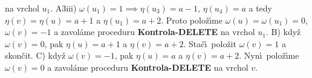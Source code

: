 na vrchol $u_1$.\newline 
A3iii) $\omega \left(u_1\right)=1\implies\eta \left(u_3\right)=a-1,\,\eta \left(u_4\right)=a$ a tedy 
$\eta \left(v\right)=\eta \left(u\right)=a+1$ a $\eta \left(u_1\right)=a+2$. Proto polo\v z\'\i me 
$\omega \left(u\right)=\omega \left(u_1\right)=0$, $\omega \left(v\right)=-1$ a zavol\'ame proceduru {\bf Kontrola-DELETE }
na vrchol $u_1$.\newline 
B) kdy\v z $\omega \left(v\right)=0$, pak $\eta \left(u\right)=a+1$ a $\eta \left(v\right)=a+2$. 
Sta\v c\'\i\ polo\v zit $\omega \left(v\right)=1$ a skon\v cit.\newline 
C) kdy\v z $\omega \left(v\right)=-1$, pak $\eta \left(u\right)=a$ a $\eta \left(v\right)=a+2$. 
Nyn\'\i\ polo\v z\'\i me $\omega \left(v\right)=0$ a 
zavol\'ame proceduru {\bf Kontrola-DELETE} na vrchol $v$.
\medskip

